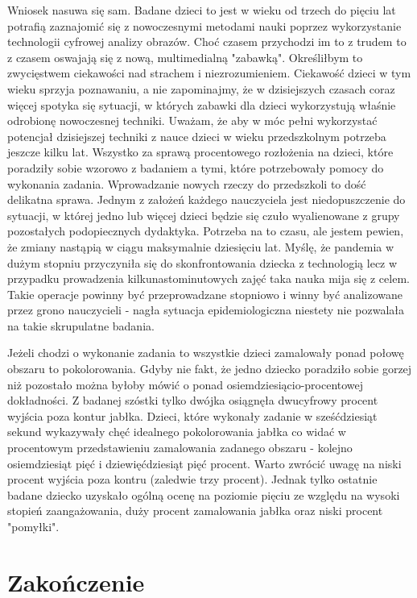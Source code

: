 \documentclass{article}
\begin{document}
\par Wniosek nasuwa się sam. Badane dzieci to jest w wieku od trzech do pięciu lat potrafią zaznajomić się z nowoczesnymi metodami nauki poprzez wykorzystanie technologii cyfrowej analizy obrazów. Choć czasem przychodzi im to z trudem to z czasem oswajają się z nową, multimedialną "zabawką". Określiłbym to zwycięstwem ciekawości nad strachem i niezrozumieniem. Ciekawość dzieci w tym wieku sprzyja poznawaniu, a nie zapominajmy, że w dzisiejszych czasach coraz więcej spotyka się sytuacji, w których zabawki dla dzieci wykorzystują właśnie odrobionę nowoczesnej techniki. Uważam, że aby w móc pełni wykorzystać potencjał dzisiejszej techniki z nauce dzieci w wieku przedszkolnym potrzeba jeszcze kilku lat. Wszystko za sprawą procentowego rozłożenia na dzieci, które poradziły sobie wzorowo z badaniem a tymi, które potrzebowały pomocy do wykonania zadania. Wprowadzanie nowych rzeczy do przedszkoli to dość delikatna sprawa. Jednym z założeń każdego nauczyciela jest niedopuszczenie do sytuacji, w której jedno lub więcej dzieci będzie się czuło wyalienowane z grupy pozostałych podopiecznych dydaktyka. Potrzeba na to czasu, ale jestem pewien, że zmiany nastąpią w ciągu maksymalnie dziesięciu lat. Myślę, że pandemia w dużym stopniu przyczyniła się do skonfrontowania dziecka z technologią lecz w przypadku prowadzenia kilkunastominutowych zajęć taka nauka mija się z celem. Takie operacje powinny być przeprowadzane stopniowo i winny być analizowane przez grono nauczycieli - nagła sytuacja epidemiologiczna niestety nie pozwalała na takie skrupulatne badania.
\par
Jeżeli chodzi o wykonanie zadania to wszystkie dzieci zamalowały ponad połowę obszaru to pokolorowania. Gdyby nie fakt, że jedno dziecko poradziło sobie gorzej niż pozostało można byłoby mówić o ponad osiemdziesiącio-procentowej dokładności. Z badanej szóstki tylko dwójka osiągnęła dwucyfrowy procent wyjścia poza kontur jabłka. Dzieci, które wykonały zadanie w sześćdziesiąt sekund wykazywały chęć idealnego pokolorowania jabłka co widać w procentowym przedstawieniu zamalowania zadanego obszaru - kolejno osiemdziesiąt pięć i dziewięćdziesiąt pięć procent. Warto zwrócić uwagę na niski procent wyjścia poza kontru (zaledwie trzy procent). Jednak tylko ostatnie badane dziecko uzyskało ogólną ocenę na poziomie pięciu ze względu na wysoki stopień zaangażowania, duży procent zamalowania jabłka oraz niski procent "pomyłki".

\newpage
\section*{Zakończenie}
\end{document}
